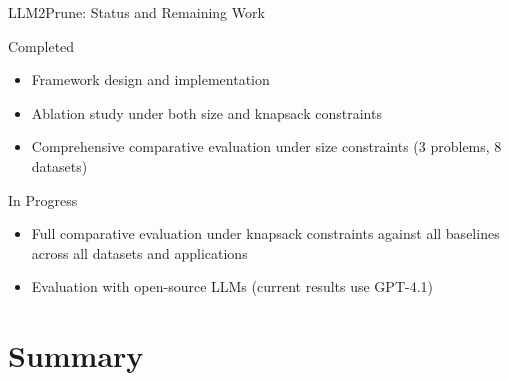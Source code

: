\documentclass[aspectratio=169,xcolor=dvipsnames,8pt]{beamer}
\begin{document}
\begin{frame}{LLM2Prune: Status and Remaining Work}
  \begin{block}{Completed}
    \begin{itemize}
      \item Framework design and implementation
      \item Ablation study under both size and knapsack constraints
      \item Comprehensive comparative evaluation under size constraints (3 problems, 8 datasets)
    \end{itemize}
  \end{block}

  \vspace{0.3cm}

  \begin{alertblock}{In Progress}
    \begin{itemize}
      \item Full comparative evaluation under knapsack constraints against all
        baselines across all datasets and applications
      \item Evaluation with open-source LLMs (current results use GPT-4.1)
    \end{itemize}
  \end{alertblock}
\end{frame}

\section{Summary}
\end{document}
